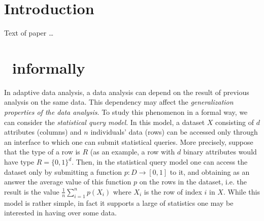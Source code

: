 \documentclass[acmsmall,review,anonymous]{acmart}\settopmatter{printfolios=true,printccs=false,printacmref=false}
\begin{document}




\maketitle


\section{Introduction}

Text of paper \ldots

\section{\THESYSTEM~informally}
In adaptive data analysis, a data analysis can depend on the result of
previous analysis on the same data. This dependency may affect the
\emph{generalization properties of the data analysis}. To study this phenomenon
in a formal way, we can consider the \emph{statistical query
  model}. In this model, a dataset $X$ consisting of $d$ attributes (columns) and $n$
individuals' data (rows) can be accessed only through an interface to
which one can submit statistical queries. More precisely, suppose that
the type of a row is $R$ (as an example, a row with $d$ binary
attributes would have type $R=\{0,1\}^d$. Then, in the statistical
query model one can access the dataset only by submitting a function
$p:D\to [0,1] $ to it, and obtaining as an answer the average value of
this function $p$ on the rows in the dataset, i.e. the result is the
value $\frac{1}{n}\sum_{i=1}^n p(X_i)$ where
$X_i$ is the row of index $i$ in $X$. While this model is rather
simple, in fact it supports a large of statistics one may be
interested in having over some data.
\end{document}
